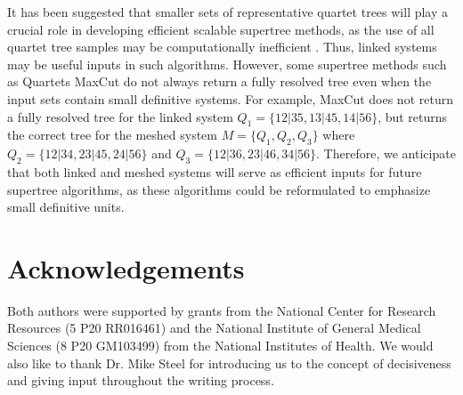 \documentclass[final,3p,times]{elsarticle}
\theoremstyle{definition}
\theoremstyle{remark}
\begin{document}
It has been suggested that smaller sets of representative quartet trees will play a crucial role in developing efficient scalable supertree methods, as the use of all quartet tree samples may be computationally inefficient  \cite{supertree}. Thus, linked systems may be useful inputs in such algorithms. However, some supertree methods such as Quartets MaxCut do not always return a fully resolved tree even when the input sets contain small definitive systems. For example, MaxCut does not return a fully resolved tree for the linked system $Q_1=\{12|35,13|45,14|56\}$, but returns the correct tree for the meshed system $M=\{Q_1,Q_2,Q_3\}$ where $Q_2=\{12|34,23|45,24|56\}$ and $Q_3=\{12|36,23|46,34|56\}$. Therefore, we anticipate that both linked and meshed systems will serve as efficient inputs for future supertree algorithms, as these algorithms could be reformulated to emphasize small definitive units. 


\section{Acknowledgements} 
Both authors were supported by grants from the National Center for Research Resources
(5 P20 RR016461) and the National Institute of General Medical Sciences (8 P20 GM103499)
from the National Institutes of Health. We would also like to thank Dr. Mike Steel for introducing us to the concept of decisiveness and giving input throughout the writing process. 
 
\appendix






% 
% 
% 
% 
% 
% 
% 
% 
% 
% 
% 
% 


\end{document}
